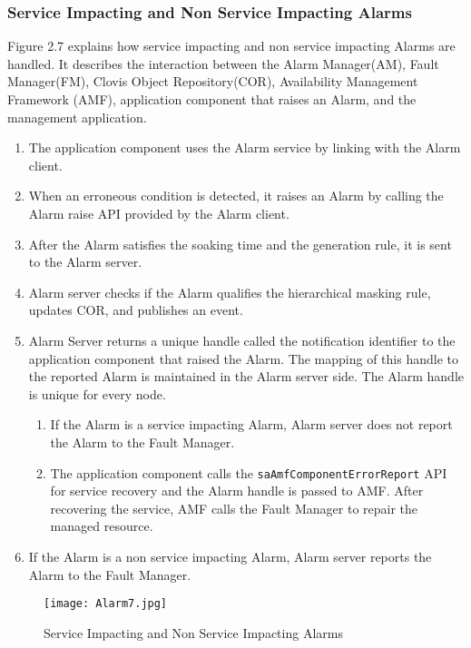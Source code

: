 \begin{flushleft}
\newpage

\subsubsection{Service Impacting and Non Service Impacting Alarms}
Figure 2.7 explains how service impacting and non service impacting Alarms are handled. It describes the interaction between the 
Alarm 
Manager(AM), Fault Manager(FM), Clovis Object Repository(COR), Availability Management Framework (AMF), application component that raises an Alarm, and 
the management application. 
\begin{enumerate}
	\item
The application component uses the Alarm service by linking with the Alarm client. 
\item
When an erroneous condition is detected, it raises an Alarm by calling the Alarm raise API provided by the Alarm client. 
\item
After the Alarm satisfies the soaking time and the generation rule, it is sent to the Alarm server. 
\item
Alarm server checks if the Alarm qualifies the hierarchical masking rule,  updates COR, and publishes an event. 
\item
Alarm Server returns a unique handle called the notification identifier to the application component that raised the Alarm. The mapping of this 
handle to the reported Alarm is maintained in the Alarm server side. The Alarm handle is unique for every node. 
\begin{enumerate}
\item
If the Alarm is a service impacting Alarm, Alarm server does not report the Alarm to the Fault Manager. 
\item
The application component calls the {\tt{saAmfComponentErrorReport}} API for service recovery and the Alarm handle is passed to AMF. After recovering the 
service, AMF calls the Fault Manager to repair the managed resource. 
	\end{enumerate}
\item
If the Alarm is a non service impacting Alarm, Alarm server reports the Alarm to the Fault Manager. 
\end{enumerate}


\begin{figure}
\begin{center}
\texttt{[image: Alarm7.jpg]}  
\end{center}
\caption{Service Impacting and Non Service Impacting Alarms}
\end{figure}




\end{flushleft}
